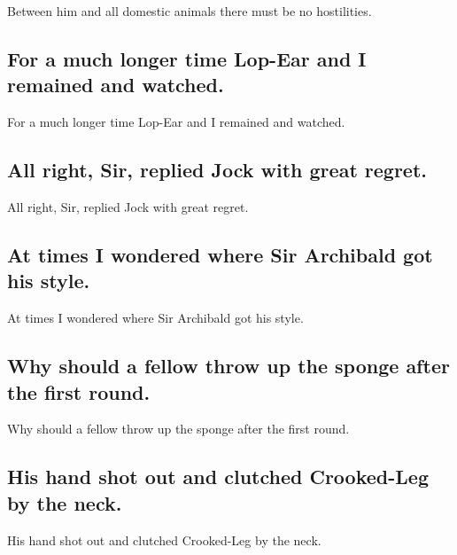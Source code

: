 \documentclass[]{article}
\begin{document}
Between him and all domestic animals there must be no hostilities.

\hypertarget{for-a-much-longer-time-lop-ear-and-i-remained-and-watched.}{%
\subsection{For a much longer time Lop-Ear and I remained and
watched.}\label{for-a-much-longer-time-lop-ear-and-i-remained-and-watched.}}

For a much longer time Lop-Ear and I remained and watched.

\hypertarget{all-right-sir-replied-jock-with-great-regret.}{%
\subsection{All right, Sir, replied Jock with great
regret.}\label{all-right-sir-replied-jock-with-great-regret.}}

All right, Sir, replied Jock with great regret.

\hypertarget{at-times-i-wondered-where-sir-archibald-got-his-style.}{%
\subsection{At times I wondered where Sir Archibald got his
style.}\label{at-times-i-wondered-where-sir-archibald-got-his-style.}}

At times I wondered where Sir Archibald got his style.

\hypertarget{why-should-a-fellow-throw-up-the-sponge-after-the-first-round.}{%
\subsection{Why should a fellow throw up the sponge after the first
round.}\label{why-should-a-fellow-throw-up-the-sponge-after-the-first-round.}}

Why should a fellow throw up the sponge after the first round.

\hypertarget{his-hand-shot-out-and-clutched-crooked-leg-by-the-neck.}{%
\subsection{His hand shot out and clutched Crooked-Leg by the
neck.}\label{his-hand-shot-out-and-clutched-crooked-leg-by-the-neck.}}

His hand shot out and clutched Crooked-Leg by the neck.
\end{document}
